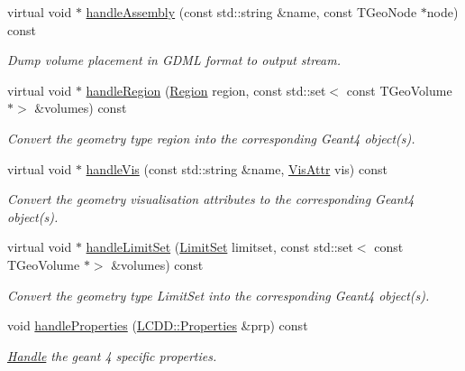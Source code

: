 \begin{DoxyCompactItemize}
virtual void $\ast$ \hyperlink{class_d_d4hep_1_1_simulation_1_1_geant4_converter_a5fca0452705b0ab14007744f15458694}{handle\+Assembly} (const std\+::string \&name, const T\+Geo\+Node $\ast$node) const
\begin{DoxyCompactList}\small\item\em Dump volume placement in G\+D\+ML format to output stream. \end{DoxyCompactList}\item 
virtual void $\ast$ \hyperlink{class_d_d4hep_1_1_simulation_1_1_geant4_converter_a062aad41974418b4047a9689ac0bfca4}{handle\+Region} (\hyperlink{class_d_d4hep_1_1_simulation_1_1_geant4_mapping_a48f9337eb1105d5874835c20456a652d}{Region} region, const std\+::set$<$ const T\+Geo\+Volume $\ast$$>$ \&volumes) const
\begin{DoxyCompactList}\small\item\em Convert the geometry type region into the corresponding Geant4 object(s). \end{DoxyCompactList}\item 
virtual void $\ast$ \hyperlink{class_d_d4hep_1_1_simulation_1_1_geant4_converter_a4cbe5b42273c1ce352acc1c4ec9490a4}{handle\+Vis} (const std\+::string \&name, \hyperlink{class_d_d4hep_1_1_simulation_1_1_geant4_mapping_aea00056d988cf94eb39b25514928e3a6}{Vis\+Attr} vis) const
\begin{DoxyCompactList}\small\item\em Convert the geometry visualisation attributes to the corresponding Geant4 object(s). \end{DoxyCompactList}\item 
virtual void $\ast$ \hyperlink{class_d_d4hep_1_1_simulation_1_1_geant4_converter_a2b6f64baaf6ad47025394cc3cb98cad9}{handle\+Limit\+Set} (\hyperlink{class_d_d4hep_1_1_simulation_1_1_geant4_mapping_a274f93e912e70a162849adb21f54184e}{Limit\+Set} limitset, const std\+::set$<$ const T\+Geo\+Volume $\ast$$>$ \&volumes) const
\begin{DoxyCompactList}\small\item\em Convert the geometry type Limit\+Set into the corresponding Geant4 object(s). \end{DoxyCompactList}\item 
void \hyperlink{class_d_d4hep_1_1_simulation_1_1_geant4_converter_a9a9563d705e1d383c8484a228a613c44}{handle\+Properties} (\hyperlink{class_d_d4hep_1_1_geometry_1_1_l_c_d_d_a89096744868821bf5dcb0c0560b348c9}{L\+C\+D\+D\+::\+Properties} \&prp) const
\begin{DoxyCompactList}\small\item\em \hyperlink{class_d_d4hep_1_1_handle}{Handle} the geant 4 specific properties. \end{DoxyCompactList}\item 

\end{DoxyCompactItemize}
